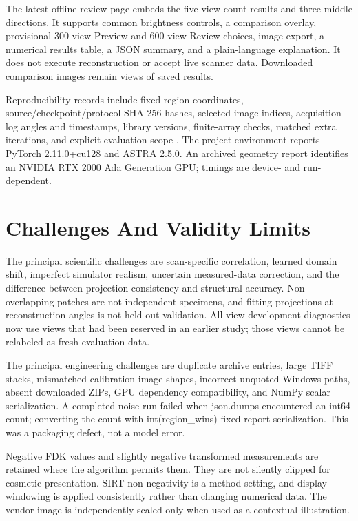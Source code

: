 \documentclass[conference,a4paper]{IEEEtran}
\begin{document}
The latest offline review page embeds the five view-count results and three middle directions. It supports common brightness controls, a comparison overlay, provisional 300-view Preview and 600-view Review choices, image export, a numerical results table, a JSON summary, and a plain-language explanation. It does not execute reconstruction or accept live scanner data. Downloaded comparison images remain views of saved results.

Reproducibility records include fixed region coordinates, source/checkpoint/protocol SHA-256 hashes, selected image indices, acquisition-log angles and timestamps, library versions, finite-array checks, matched extra iterations, and explicit evaluation scope \cite{ref10}. The project environment reports PyTorch 2.11.0+cu128 and ASTRA 2.5.0. An archived geometry report identifies an NVIDIA RTX 2000 Ada Generation GPU; timings are device- and run-dependent.

\section{Challenges And Validity Limits}

The principal scientific challenges are scan-specific correlation, learned domain shift, imperfect simulator realism, uncertain measured-data correction, and the difference between projection consistency and structural accuracy. Non-overlapping patches are not independent specimens, and fitting projections at reconstruction angles is not held-out validation. All-view development diagnostics now use views that had been reserved in an earlier study; those views cannot be relabeled as fresh evaluation data.

The principal engineering challenges are duplicate archive entries, large TIFF stacks, mismatched calibration-image shapes, incorrect unquoted Windows paths, absent downloaded ZIPs, GPU dependency compatibility, and NumPy scalar serialization. A completed noise run failed when json.dumps encountered an int64 count; converting the count with int(region\_wins) fixed report serialization. This was a packaging defect, not a model error.

Negative FDK values and slightly negative transformed measurements are retained where the algorithm permits them. They are not silently clipped for cosmetic presentation. SIRT non-negativity is a method setting, and display windowing is applied consistently rather than changing numerical data. The vendor image is independently scaled only when used as a contextual illustration.
\end{document}

